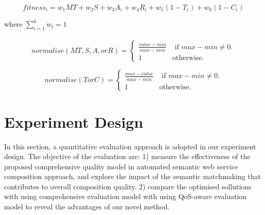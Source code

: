 \documentclass{llncs}
\begin{document}
\begin{equation}
\label{equation7}
fitness_i = w_1MT + w_2S + w_3A_i + w_4R_i + w_5(1 - T_i) + w_6(1 - C_i)
\end{equation}

\noindent where $\sum_{i=1}^{6} w_i = 1$
\\\\
\begin{equation}
\label{equation8}
normalise(MT, S, A, or R) = 
\begin{cases}
	\frac{value - min}{max - min} & \text{ if }max - min \neq 0.\\
	1 & \mathrm{ otherwise}.
\end{cases}
\end{equation}

\begin{equation}
\label{equation9}
normalise(T or C) = 
\begin{cases}
	\frac{max - value}{max - min} & \text{ if }max - min \neq 0.\\
	1 & \mathrm{ otherwise}.
\end{cases}
\end{equation}

\section{Experiment Design}\label{experiment_design}
In this section, a quantitative evaluation approach is adopted in our experiment design. The objective of the evaluation are: 1) measure the effectiveness of the proposed comprehensive quality model in automated semantic web service composition approach, and explore the impact of the semantic matchmaking that contributes to overall composition quality. 2) compare the optimised sollutions with using comprehensive evaluation model with using QoS-aware evaluation model to reveal the advantages of our novel method.
\end{document}
